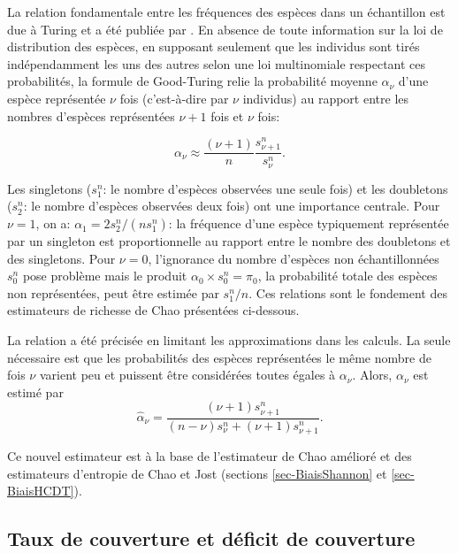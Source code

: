 \documentclass[
  11pt,
  french,
  a4paper,
  extrafontsizes,onecolumn,openright
  ]{memoir}
\begin{document}
La relation fondamentale entre les fréquences des espèces dans un échantillon est due à Turing et a été publiée par \textcite{Good1953}.
En absence de toute information sur la loi de distribution des espèces, en supposant seulement que les individus sont tirés indépendamment les uns des autres selon une loi multinomiale respectant ces probabilités, la formule de Good-Turing relie la probabilité moyenne \(\alpha_\nu\) d'une espèce représentée \(\nu\) fois (c'est-à-dire par \(\nu\) individus) au rapport entre les nombres d'espèces représentées \(\nu+1\) fois et \(\nu\) fois:

\begin{equation}
  \label{eq:alphanu}
  \alpha_\nu \approx \frac{(\nu+1)}{n} \frac{s^{n}_{\nu+1}}{s^{n}_{\nu}}.
\end{equation}

Les singletons (\(s^{n}_{1}\): le nombre d'espèces observées une seule fois) et les doubletons (\(s^{n}_{2}\): le nombre d'espèces observées deux fois) ont une importance centrale.
Pour \(\nu=1\), on a: \(\alpha_1 = 2 s^{n}_{2}/(ns^{n}_{1})\): la fréquence d'une espèce typiquement représentée par un singleton est proportionnelle au rapport entre le nombre des doubletons et des singletons.
Pour \(\nu=0\), l'ignorance du nombre d'espèces non échantillonnées \(s^{n}_{0}\) pose problème mais le produit \(\alpha_0 \times s^{n}_{0} = \pi_0\), la probabilité totale des espèces non représentées, peut être estimée par \(s^{n}_{1}/n\).
Ces relations sont le fondement des estimateurs de richesse de Chao présentées ci-dessous.

La relation a été précisée \autocite[eq. 6 et 7a]{Chiu2014a} en limitant les approximations dans les calculs.
La seule nécessaire est que les probabilités des espèces représentées le même nombre de fois \(\nu\) varient peu et puissent être considérées toutes égales à \(\alpha_\nu\).
Alors, \(\alpha_\nu\) est estimé par
\begin{equation}
  \label{eq:GoodTuring2014}
  \hat{\alpha}_\nu = \frac{\left(\nu+1 \right) s^{n}_{\nu+1}}{\left(n-\nu \right) s^{n}_{\nu} + \left(\nu+1 \right) s^{n}_{\nu+1}}.
\end{equation}

Ce nouvel estimateur est à la base de l'estimateur de Chao amélioré et des estimateurs d'entropie de Chao et Jost (sections \ref{sec-BiaisShannon} et \ref{sec-BiaisHCDT}).

\subsection{Taux de couverture et déficit de couverture}\label{taux-de-couverture-et-duxe9ficit-de-couverture}
\end{document}

